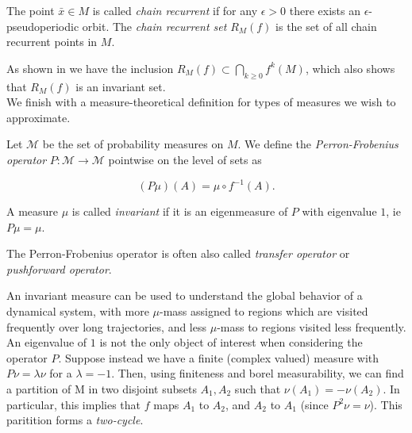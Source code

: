 \begin{definition}
    \cite*{dynbook} The point $\bar{x} \in M$ is called \emph{chain recurrent} if for any $\epsilon > 0$ 
    there exists an $\epsilon$-pseudoperiodic orbit. The \emph{chain recurrent set} $R_M(f)$ 
    is the set of all chain recurrent points in $M$.
\end{definition}

As shown in \cite*{algGAIO} we have the inclusion $R_M(f) \subset \bigcap\limits_{k \geq 0} f^k(M)$,
which also shows that $R_M(f)$ is an invariant set. \\

We finish with a measure-theoretical definition for types of measures we wish to approximate.

\begin{definition}
    \cite*{attr} Let $\mathcal{M}$ be the set of probability measures on $M$. We define the
    \emph{Perron-Frobenius operator} $P:\mathcal{M} \rightarrow \mathcal{M}$ pointwise
    on the level of sets as

    \begin{equation}
        (P\mu)(A) = \mu \circ f^{-1}(A).
    \end{equation}

    A measure $\mu$ is called \emph{invariant} if it is an eigenmeasure of $P$ with
    eigenvalue $1$, ie $P\mu = \mu$.
\end{definition}

\begin{remark}
    The Perron-Frobenius operator is often also called \emph{transfer operator} or
    \emph{pushforward operator}. 
\end{remark}

An invariant measure can be used to understand the global behavior of a dynamical 
system, with more $\mu$-mass assigned to regions which are visited frequently over long
trajectories, and less $\mu$-mass to regions visited less frequently. \\

An eigenvalue of $1$ is not the only object of interest when considering the operator $P$.
Suppose instead we have a finite (complex valued) measure with $P \nu = \lambda \nu$ for a 
$\lambda = -1$. Then, using finiteness and borel measurability, we can find 
a partition of M in two disjoint subsets $A_1, A_2$ such that $\nu (A_1) = - \nu (A_2)$.
In particular, this implies that $f$ maps $A_1$ to $A_2$, and $A_2$ to $A_1$ 
(since $P^2 \nu = \nu$). This paritition forms a \emph{two-cycle}.
